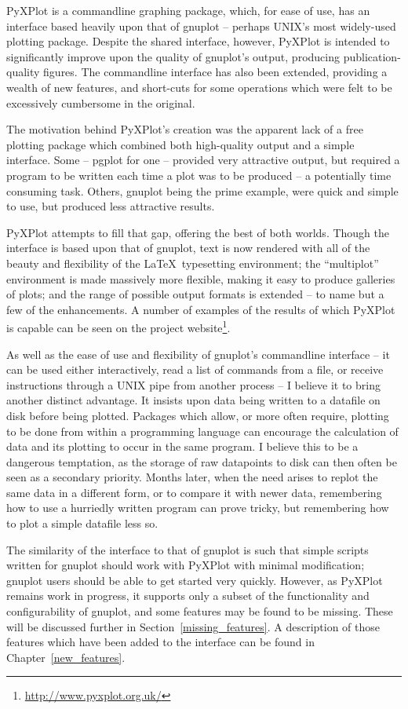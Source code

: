 \documentclass[a4paper,onecolumn,11pt]{book}
\begin{document}
PyXPlot is a commandline graphing package, which, for ease of use, has an
interface based heavily upon that of gnuplot -- perhaps UNIX's most widely-used
plotting package. Despite the shared interface, however, PyXPlot is intended to
significantly improve upon the quality of gnuplot's output, producing
publication-quality figures. The commandline interface has also been extended,
providing a wealth of new features, and short-cuts for some operations which
were felt to be excessively cumbersome in the original.

The motivation behind PyXPlot's creation was the apparent lack of a free
plotting package which combined both high-quality output and a simple
interface.  Some -- pgplot for one -- provided very attractive output, but
required a program to be written each time a plot was to be produced -- a
potentially time consuming task. Others, gnuplot being the prime example, were
quick and simple to use, but produced less attractive results.

PyXPlot attempts to fill that gap, offering the best of both worlds. Though the
interface is based upon that of gnuplot, text is now rendered with all of the
beauty and flexibility of the \LaTeX\ typesetting environment; the
``multiplot'' environment is made massively more flexible, making it easy to
produce galleries of plots; and the range of possible output formats is
extended -- to name but a few of the enhancements. A number of examples of the
results of which PyXPlot is capable can be seen on the project
website\footnote{\url{http://www.pyxplot.org.uk/}}.

As well as the ease of use and flexibility of gnuplot's commandline interface
-- it can be used either interactively, read a list of commands from a file, or
receive instructions through a UNIX pipe from another process -- I believe it
to bring another distinct advantage. It insists upon data being written to a
datafile on disk before being plotted. Packages which allow, or more often
require, plotting to be done from within a programming language can encourage
the calculation of data and its plotting to occur in the same program. I
believe this to be a dangerous temptation, as the storage of raw datapoints to
disk can then often be seen as a secondary priority. Months later, when the
need arises to replot the same data in a different form, or to compare it with
newer data, remembering how to use a hurriedly written program can prove
tricky, but remembering how to plot a simple datafile less so.

The similarity of the interface to that of gnuplot is such that simple scripts
written for gnuplot should work with PyXPlot with minimal modification; gnuplot
users should be able to get started very quickly.  However, as PyXPlot remains
work in progress, it supports only a subset of the functionality and
configurability of gnuplot, and some features may be found to be missing.
These will be discussed further in Section~\ref{missing_features}. A
description of those features which have been added to the interface can be
found in Chapter~\ref{new_features}.
\end{document}
